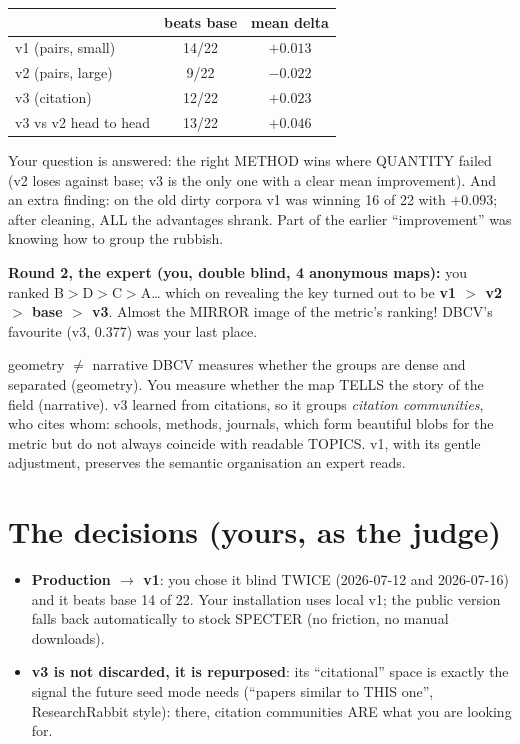 \documentclass[11pt,a4paper]{article}
\begin{document}
\begin{center}
\begin{tabular}{lcc}
 & beats base & mean delta \\
\hline
v1 (pairs, small)   & 14/22 & $+0.013$ \\
v2 (pairs, large)   & 9/22  & $-0.022$ \\
v3 (citation)       & 12/22 & $\mathbf{+0.023}$ \\
v3 vs v2 head to head & 13/22 & $+0.046$ \\
\end{tabular}
\end{center}

Your question is answered: the right METHOD wins where QUANTITY failed (v2 loses against base;
v3 is the only one with a clear mean improvement). And an extra finding: on the old dirty
corpora v1 was winning 16 of 22 with $+0.093$; after cleaning, ALL the advantages shrank. Part
of the earlier ``improvement'' was knowing how to group the rubbish.

\textbf{Round 2, the expert (you, double blind, 4 anonymous maps):} you ranked
B$>$D$>$C$>$A\ldots{} which on revealing the key turned out to be \textbf{v1 $>$ v2 $>$ base $>$
v3}. Almost the MIRROR image of the metric's ranking! DBCV's favourite (v3, 0.377) was your last
place.

\begin{concepto}{geometry $\neq$ narrative}
DBCV measures whether the groups are dense and separated (geometry). You measure whether the map
TELLS the story of the field (narrative). v3 learned from citations, so it groups
\emph{citation communities}, who cites whom: schools, methods, journals, which form beautiful
blobs for the metric but do not always coincide with readable TOPICS. v1, with its gentle
adjustment, preserves the semantic organisation an expert reads.
\end{concepto}

\section{The decisions (yours, as the judge)}

\begin{itemize}
  \item \textbf{Production $\to$ v1}: you chose it blind TWICE (2026-07-12 and 2026-07-16) and
        it beats base 14 of 22. Your installation uses local v1; the public version falls back
        automatically to stock SPECTER (no friction, no manual downloads).
  \item \textbf{v3 is not discarded, it is repurposed}: its ``citational'' space is exactly the
        signal the future seed mode needs (``papers similar to THIS one'', ResearchRabbit
        style): there, citation communities ARE what you are looking for.
\end{itemize}
\end{document}
